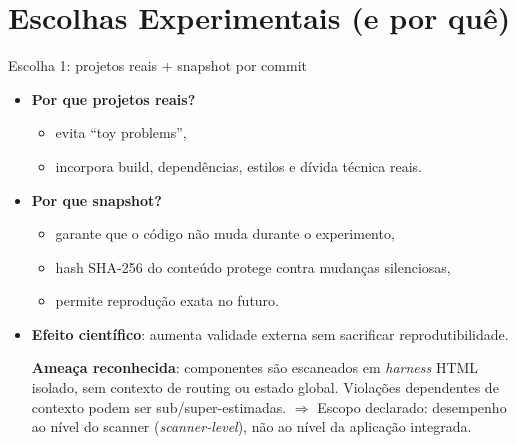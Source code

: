 \documentclass[aspectratio=169]{beamer}
\begin{document}
\section{Escolhas Experimentais (e por quê)}

\begin{frame}{Escolha 1: projetos reais + snapshot por commit}
\small
\begin{itemize}
  \item \textbf{Por que projetos reais?}
  \begin{itemize}
    \item evita ``toy problems'',
    \item incorpora build, dependências, estilos e dívida técnica reais.
  \end{itemize}
  \item \textbf{Por que snapshot?}
  \begin{itemize}
    \item garante que o código não muda durante o experimento,
    \item hash SHA-256 do conteúdo protege contra mudanças silenciosas,
    \item permite reprodução exata no futuro.
  \end{itemize}
  \item \textbf{Efeito científico}: aumenta validade externa sem sacrificar
        reprodutibilidade.

  \medskip
  \alert{\textbf{Ameaça reconhecida}}: componentes são escaneados em
  \emph{harness} HTML isolado, sem contexto de routing ou estado global.
  Violações dependentes de contexto podem ser sub/super-estimadas.
  $\Rightarrow$ Escopo declarado: desempenho ao nível do scanner
  (\emph{scanner-level}), não ao nível da aplicação integrada.
\end{itemize}
\end{frame}
\end{document}
